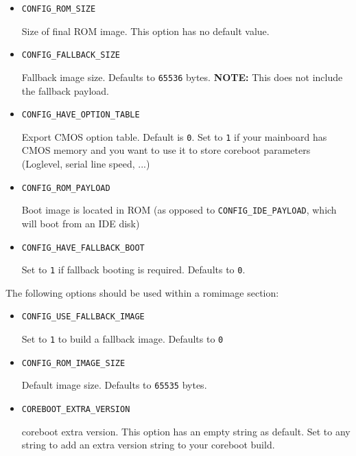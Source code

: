 \documentclass[titlepage,12pt]{article}
\begin{document}
\begin{itemize}
\item \begin{verbatim}CONFIG_ROM_SIZE\end{verbatim}

Size of final ROM image. This option has no default value.

\item \begin{verbatim}CONFIG_FALLBACK_SIZE\end{verbatim}

Fallback image size. Defaults to \texttt{65536} bytes. \textbf{NOTE:}
This does not include the fallback payload.

\item \begin{verbatim}CONFIG_HAVE_OPTION_TABLE\end{verbatim}

Export CMOS option table. Default is \texttt{0}. Set to \texttt{1} if
your mainboard has CMOS memory and you want to use it to store
coreboot parameters (Loglevel, serial line speed, ...)

\item \begin{verbatim}CONFIG_ROM_PAYLOAD\end{verbatim}

Boot image is located in ROM (as opposed to \texttt{CONFIG\_IDE\_PAYLOAD}, which
will boot from an IDE disk)

\item \begin{verbatim}CONFIG_HAVE_FALLBACK_BOOT\end{verbatim}

Set to \texttt{1} if fallback booting is required. Defaults to
\texttt{0}.

\end{itemize}


The following options should be used within a romimage section:

\begin{itemize}

\item \begin{verbatim}CONFIG_USE_FALLBACK_IMAGE\end{verbatim}

Set to \texttt{1} to build a fallback image. Defaults to \texttt{0}

\item \begin{verbatim}CONFIG_ROM_IMAGE_SIZE\end{verbatim}

Default image size. Defaults to \texttt{65535} bytes.

\item \begin{verbatim}COREBOOT_EXTRA_VERSION\end{verbatim}

coreboot extra version. This option has an empty string as default. Set
to any string to add an extra version string to your coreboot build.

\end{itemize}
\end{document}
